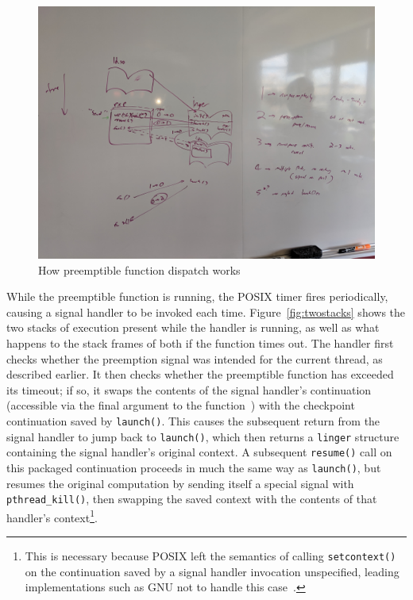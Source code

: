 \begin{figure}
\includegraphics[width=\columnwidth]{figs/calltree}
\caption{How preemptible function dispatch works}
\label{fig:callsimple}
\end{figure}

While the preemptible function is running, the POSIX timer fires periodically,
causing a signal handler to be invoked each time.  Figure~\ref{fig:twostacks} shows
the two stacks of execution present while the handler is running, as well as what
happens to the stack frames of both if the function times out.  The handler first
checks whether the preemption signal was intended for the current thread, as
described earlier.  It then checks whether the preemptible function has exceeded its
timeout; if so, it swaps the contents of the signal handler's continuation
(accessible via the final argument to the function~\cite{sigaction-manpage}) with the
checkpoint continuation saved by \texttt{launch()}.  This causes the subsequent
return from the signal handler to jump back to \texttt{launch()}, which then returns
a \texttt{linger} structure containing the signal handler's original context.  A
subsequent \texttt{resume()} call on this packaged continuation proceeds in much the
same way as \texttt{launch()}, but resumes the original computation by sending itself
a special signal with \texttt{pthread\_kill()}, then swapping the saved context with
the contents of that handler's context\footnote{This is necessary because POSIX left
the semantics of calling \texttt{setcontext()} on the continuation saved by a signal
handler invocation unspecified, leading implementations such as GNU not to handle
this case~\cite{getcontext-manpage}.}.

